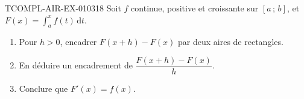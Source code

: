\begin{exercice}{TCOMPL-AIR-EX-010}{3}{18}
Soit $f$ continue, positive et croissante sur $[a\,;\,b]$, et
$F(x)=\displaystyle\int_a^x f(t)\,\mathrm{d}t$.
\begin{enumerate}
  \item Pour $h>0$, encadrer $F(x+h)-F(x)$ par deux aires de rectangles.
  \item En déduire un encadrement de $\dfrac{F(x+h)-F(x)}{h}$.
  \item Conclure que $F'(x)=f(x)$.
\end{enumerate}
\end{exercice}
